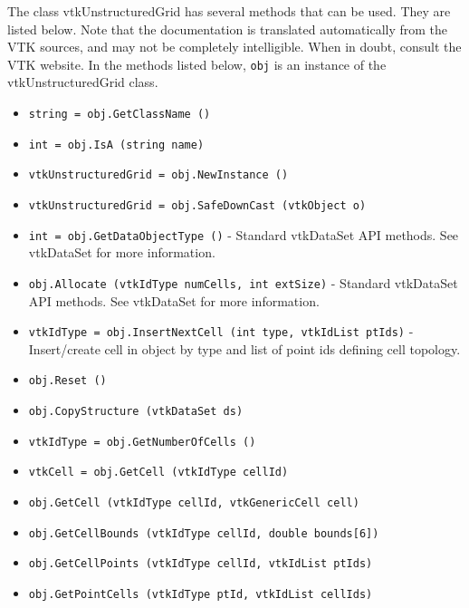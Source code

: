 The class vtkUnstructuredGrid has several methods that can be used.
  They are listed below.
Note that the documentation is translated automatically from the VTK sources,
and may not be completely intelligible.  When in doubt, consult the VTK website.
In the methods listed below, \verb|obj| is an instance of the vtkUnstructuredGrid class.
\begin{itemize}
\item  \verb|string = obj.GetClassName ()|

\item  \verb|int = obj.IsA (string name)|

\item  \verb|vtkUnstructuredGrid = obj.NewInstance ()|

\item  \verb|vtkUnstructuredGrid = obj.SafeDownCast (vtkObject o)|

\item  \verb|int = obj.GetDataObjectType ()| -  Standard vtkDataSet API methods. See vtkDataSet for more information.

\item  \verb|obj.Allocate (vtkIdType numCells, int extSize)| -  Standard vtkDataSet API methods. See vtkDataSet for more information.

\item  \verb|vtkIdType = obj.InsertNextCell (int type, vtkIdList ptIds)| -  Insert/create cell in object by type and list of point ids defining
 cell topology.

\item  \verb|obj.Reset ()|

\item  \verb|obj.CopyStructure (vtkDataSet ds)|

\item  \verb|vtkIdType = obj.GetNumberOfCells ()|

\item  \verb|vtkCell = obj.GetCell (vtkIdType cellId)|

\item  \verb|obj.GetCell (vtkIdType cellId, vtkGenericCell cell)|

\item  \verb|obj.GetCellBounds (vtkIdType cellId, double bounds[6])|

\item  \verb|obj.GetCellPoints (vtkIdType cellId, vtkIdList ptIds)|

\item  \verb|obj.GetPointCells (vtkIdType ptId, vtkIdList cellIds)|


\end{itemize}
